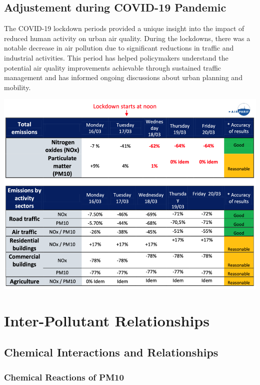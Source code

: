 \documentclass{modeleRapport}
\begin{document}
\newpage
\subsection{Adjustement during COVID-19 Pandemic}

The COVID-19 lockdown periods provided a unique insight into the impact of reduced human activity on urban air quality. 
During the lockdowns, there was a notable decrease in air pollution due to significant reductions in traffic and industrial 
activities. This period has helped policymakers understand the potential air quality improvements achievable through sustained 
traffic management and has informed ongoing discussions about urban planning and mobility.\cite{Covid19}\\

\begin{center}
    \includegraphics[width=16cm]{Images/covid19AirParif.png}
\end{center}


\newpage
\section{Inter-Pollutant Relationships}

\subsection{Chemical Interactions and Relationships}

\subsubsection{Chemical Reactions of PM10}
\end{document}
